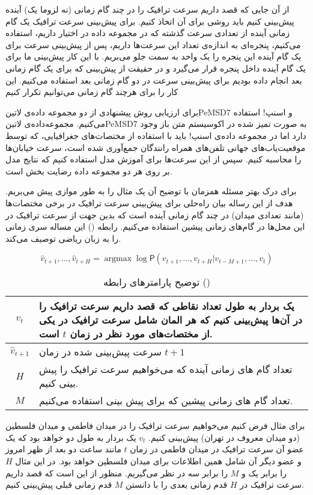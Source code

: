 از آن جایی که قصد داریم سرعت ترافیک را در چند گام زمانی (نه لزوما یک) آینده پیش‌بینی کنیم باید روشی برای آن اتخاذ کنیم. برای پیش‌بینی سرعت ترافیک یک گام زمانی آینده از تعدادی سرعت گذشته که در مجموعه داده در اختیار داریم، استفاده می‌کنیم، پنجره‌ای به اندازه‌ی تعداد این سرعت‌ها داریم، پس از پیش‌بینی سرعت برای یک گام آینده این پنجره را یک واحد به سمت جلو می‌بریم. با این کار پیش‌بینی ما برای یک گام آینده داخل پنجره قرار می‌گیرد و در حقیقت از پیش‌بینی که برای یک گام زمانی بعد انجام داده بودیم برای پیش‌بینی سرعت در دو گام زمانی بعد استفاده می‌کنیم. این کار را برای هرچند گام زمانی می‌توانیم تکرار کنیم

برای ارزیابی روش پیشنهادی از دو مجموعه داده‌ی ‌لاتین{PeMSD7} و اسنپ! استفاده می‌کنیم. مجموعه‌داده‌ی ‌لاتین{PeMSD7} به صورت تمیز شده در اکوسیستم متن باز وجود دارد
اما در مجموعه داده‌ی اسنپ! باید با استفاده از مختصات‌های جغرافیایی، که توسط موقعیت‌یاب‌های
جهانی تلفن‌های همراه رانندگان جمع‌آوری شده است، سرعت خیابان‌ها را محاسبه کنیم.
سپس از این سرعت‌ها برای آموزش مدل استفاده کنیم که نتایج مدل بر روی هر دو مجموعه داده رضایت بخش است.


برای درک بهتر مسئله همزمان با توضیح آن یک مثال را به طور موازی پیش می‌بریم.
هدف از این رساله بیان راه‌حلی برای پیش‌بینی سرعت ترافیک در برخی مختصات‌ها (مانند تعدادی میدان) در چند گام زمانی آینده است که
بدین جهت از سرعت ترافیک در این محل‌ها در گام‌های زمانی پیشین استفاده می‌کنیم. رابطه () این مساله سری زمانی را به زبان ریاضی توصیف می‌کند.

\begin{equation}
  \label{eq:base}
  \hat{v}_{t+1}, \ldots,  \hat{v}_{t+H} = \mathop{\mathrm{argmax}} \log \mathsf{P}({v}_{t+1}, \ldots,  v_{t+H} | v_{t-M+1} , \ldots,  v_{t})
\end{equation}

\begin{table}[h]
  \centering
  \caption{توضیح پارامترهای رابطه ()}
  \begin{tabular}{|c|p{}|}
    \hline
    $v_{t}$ & یک بردار به طول تعداد نقاطی که قصد داریم سرعت ترافیک را در آن‌ها پیش‌بینی کنیم که هر المان شامل سرعت ترافیک در یکی از مختصات‌های مورد نظر در زمان $t$ است. \\
    \hline
    $\hat{v}_{t+1}$ & سرعت پیش‌بینی شده در زمان $t+1$ \\
    \hline
    $H$ & تعداد گام های زمانی آینده که می‌خواهیم سرعت ترافیک را پیش بینی کنیم. \\
    \hline
    $M$ & تعداد گام های زمانی پیشین که برای پیش بینی استفاده می‌کنیم. \\
    \hline
  \end{tabular}
  \label{tbl:base}
\end{table}

برای مثال فرض کنیم می‌خواهیم سرعت ترافیک را در میدان فاطمی و میدان فلسطین (دو میدان معروف در تهران) پیش‌بینی کنیم.
$v_{t}$ یک بردار به طول دو خواهد بود که یک عضو آن سرعت ترافیک در میدان فاطمی در زمان $t$ مانند ساعت دو بعد از ظهر امروز و عضو دیگر آن شامل همین اطلاعات برای میدان فلسطین خواهد بود.
در این مثال $H$ را برابر یک و $M$ را برابر سه در نظر می‌گیریم. منظور از  این است که قصد داریم سرعت ترافیک در $H$ قدم زمانی بعدی را با دانستن $M$ قدم زمانی قبلی پیش‌بینی کنیم.
